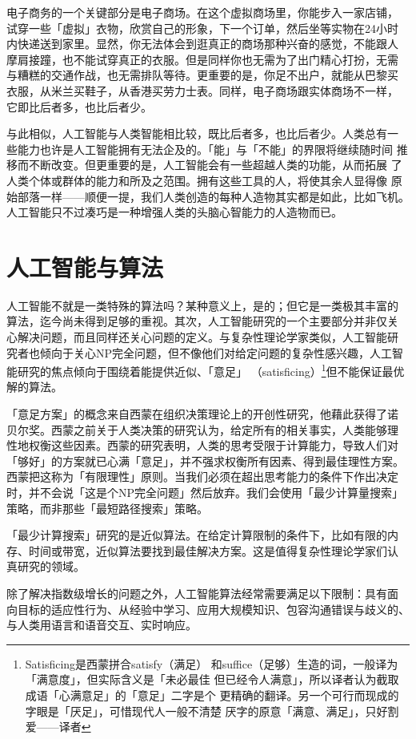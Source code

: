 \documentclass[12pt,a4paper]{article}
\begin{document}
电子商务的一个关键部分是电子商场。在这个虚拟商场里，你能步入一家店铺，
试穿一些「虚拟」衣物，欣赏自己的形象，下一个订单，然后坐等实物在24小时
内快递送到家里。显然，你无法体会到逛真正的商场那种兴奋的感觉，不能跟人
摩肩接蹱，也不能试穿真正的衣服。但是同样你也无需为了出门精心打扮，无需
与糟糕的交通作战，也无需排队等待。更重要的是，你足不出户，就能从巴黎买
衣服，从米兰买鞋子，从香港买劳力士表。同样，电子商场跟实体商场不一样，
它即比后者多，也比后者少。

与此相似，人工智能与人类智能相比较，既比后者多，也比后者少。人类总有一
些能力也许是人工智能拥有无法企及的。「能」与「不能」的界限将继续随时间
推移而不断改变。但更重要的是，人工智能会有一些超越人类的功能，从而拓展
了人类个体或群体的能力和所及之范围。拥有这些工具的人，将使其余人显得像
原始部落一样——顺便一提，我们人类创造的每种人造物其实都是如此，比如飞机。
人工智能只不过凑巧是一种增强人类的头脑心智能力的人造物而已。

\section{人工智能与算法}

人工智能不就是一类特殊的算法吗？某种意义上，是的；但它是一类极其丰富的
算法，迄今尚未得到足够的重视。其次，人工智能研究的一个主要部分并非仅关
心解决问题，而且同样还关心问题的定义。与复杂性理论学家类似，人工智能研
究者也倾向于关心NP完全问题，但不像他们对给定问题的复杂性感兴趣，人工智
能研究的焦点倾向于围绕着能提供近似、「意足」
（satisficing）\footnote{Satisficing是西蒙拼合satisfy（满足）
  和suffice（足够）生造的词，一般译为「满意度」，但实际含义是「未必最佳
  但已经令人满意」，所以译者认为截取成语「心满意足」的「意足」二字是个
  更精确的翻译。另一个可行而现成的字眼是「厌足」，可惜现代人一般不清楚
  厌字的原意「满意、满足」，只好割爱——译者}但不能保证最优解的算法。

「意足方案」的概念来自西蒙在组织决策理论上的开创性研究，他藉此获得了诺
贝尔奖。西蒙之前关于人类决策的研究认为，给定所有的相关事实，人类能够理
性地权衡这些因素。西蒙的研究表明，人类的思考受限于计算能力，导致人们对
「够好」的方案就已心满「意足」，并不强求权衡所有因素、得到最佳理性方案。
西蒙把这称为「有限理性」原则。当我们必须在超出思考能力的条件下作出决定
时，并不会说「这是个NP完全问题」然后放弃。我们会使用「最少计算量搜索」
策略，而非那些「最短路径搜索」策略。

「最少计算搜索」研究的是近似算法。在给定计算限制的条件下，比如有限的内
存、时间或带宽，近似算法要找到最佳解决方案。这是值得复杂性理论学家们认
真研究的领域。

除了解决指数级增长的问题之外，人工智能算法经常需要满足以下限制：具有面
向目标的适应性行为、从经验中学习、应用大规模知识、包容沟通错误与歧义的、
与人类用语言和语音交互、实时响应。
\end{document}
